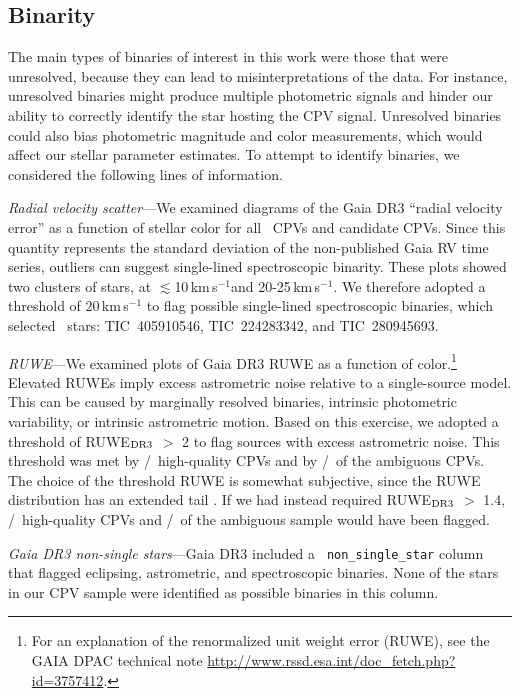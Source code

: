 \documentclass[11pt,twocolumn,tighten]{aastex63}
\newcommand{\kms}{{km\,s$^{-1}$}}
\begin{document}
\subsection{Binarity}
\label{subsec:binarity}

The main types of binaries of interest in this work were those that
were unresolved, because they can lead to misinterpretations of the data.
For instance, unresolved binaries might produce multiple photometric
signals and hinder our ability to correctly identify the star hosting
the CPV signal.  Unresolved binaries could also bias photometric magnitude
and color measurements, which would affect our stellar parameter
estimates.  To attempt to identify binaries, we considered the
following lines of information.


{\it Radial velocity scatter}---We examined diagrams of the Gaia DR3
``radial velocity error'' as a function of stellar color for all
\ncqvsnodebunked\ CPVs and candidate CPVs.  Since this quantity
represents the standard deviation of the non-published Gaia RV time
series, outliers can suggest single-lined spectroscopic binarity.
These plots showed two clusters of stars, at $\lesssim$10\,\kms and
20-25\,\kms.  We therefore adopted a threshold of $20$\,km\,s$^{-1}$ to
flag possible single-lined spectroscopic binaries, which selected
\nrvscatterflag\ stars: TIC~405910546, TIC~224283342, and
TIC~280945693.

{\it RUWE}---We examined plots of Gaia DR3 RUWE as a function of
color.\footnote{For an explanation of the renormalized unit weight
error (RUWE), see the GAIA DPAC technical note
\url{http://www.rssd.esa.int/doc_fetch.php?  id=3757412}.}  Elevated
RUWEs imply excess astrometric noise relative to a single-source
model.  This can be caused by marginally resolved binaries,  intrinsic
photometric variability, or intrinsic astrometric motion.  Based on
this exercise, we adopted a threshold of RUWE$_{\rm DR3}$ $>$ 2 to
flag sources with excess astrometric noise.  This threshold was met
by \ngoodhighruwe/\ngoods\ high-quality CPVs and by
\nmaybehighruwe/\nmaybes\ of the ambiguous CPVs.  The choice of the threshold RUWE
is somewhat subjective, since the RUWE distribution has an extended tail
\citep[e.g.][]{2022MNRAS.513.5270P}.  If we had instead required
RUWE$_{\rm DR3}$ $>$ 1.4, \ngoodweakruwe/\ngoods\ high-quality CPVs
and \nmaybeweakruwe/\nmaybes\ of the ambiguous sample would have been
flagged.

{\it Gaia DR3 non-single stars}---Gaia DR3 included a {\tt
non\_single\_star} column that flagged eclipsing, astrometric, and
spectroscopic binaries.  None of the stars in our CPV sample were
identified as possible binaries in this column.
\end{document}
